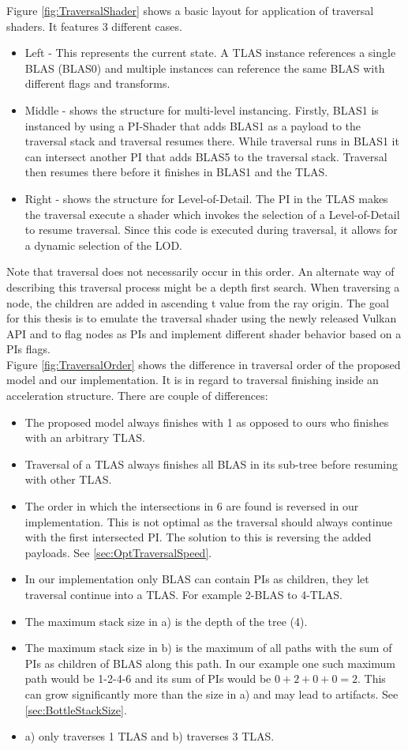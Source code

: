 Figure \ref{fig:TraversalShader} shows a basic layout for application of traversal shaders. It features 3 different cases.
\begin{itemize}
    \item Left - This represents the current state. A TLAS instance references a single BLAS (BLAS0) and multiple instances can reference the same BLAS with different flags and transforms.
    \item Middle - shows the structure for multi-level instancing. Firstly, BLAS1 is instanced by using a PI-Shader that adds BLAS1 as a payload to the traversal stack and traversal resumes there. While traversal runs in BLAS1 it can intersect another PI that adds BLAS5 to the traversal stack. Traversal then resumes there before it finishes in BLAS1 and the TLAS.
    \item Right - shows the structure for Level-of-Detail. The PI in the TLAS makes the traversal execute a shader which invokes the selection of a Level-of-Detail to resume traversal. Since this code is executed during traversal, it allows for a dynamic selection of the LOD.
\end{itemize}
Note that traversal does not necessarily occur in this order. An alternate way of describing this traversal process might be a depth first search. When traversing a node, the children are added in ascending t value from the ray origin. The goal for this thesis is to emulate the traversal shader using the newly released Vulkan API and to flag nodes as PIs and implement different shader behavior based on a PIs flags.\cite{traversalArticle}\\
Figure \ref{fig:TraversalOrder} shows the difference in traversal order of the proposed model and our implementation. It is in regard to traversal finishing inside an acceleration structure. There are couple of differences:
\begin{itemize}
    \item The proposed model always finishes with 1 as opposed to ours who finishes with an arbitrary TLAS.
    \item Traversal of a TLAS always finishes all BLAS in its sub-tree before resuming with other TLAS.
    \item The order in which the intersections in 6 are found is reversed in our implementation. This is not optimal as the traversal should always continue with the first intersected PI. The solution to this is reversing the added payloads. See \ref{sec:OptTraversalSpeed}.
    \item In our implementation only BLAS can contain PIs as children, they let traversal continue into a TLAS. For example 2-BLAS to 4-TLAS.
    \item The maximum stack size in a) is the depth of the tree (4).
    \item The maximum stack size in b) is the maximum of all paths with the sum of PIs as children of BLAS along this path. In our example one such maximum path would be 1-2-4-6 and its sum of PIs would be $0+2+0+0=2$. This can grow significantly more than the size in a) and may lead to artifacts. See \ref{sec:BottleStackSize}.
    \item a) only traverses 1 TLAS and b) traverses 3 TLAS.
\end{itemize}
